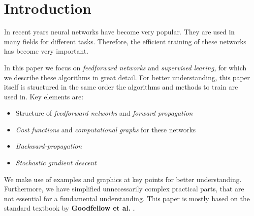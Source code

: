 \section{Introduction}
\label{sec:introduction}

In recent years neural networks have become very popular.
They are used in many fields for different tasks.
Therefore, the efficient training of these networks has become very important.

In this paper we focus on \emph{feedforward networks} and \emph{supervised learing}, for which we describe these algorithms in great detail.
For better understanding, this paper itself is structured in the same order the algorithms and methods to train are used in.
Key elements are:
\begin{itemize}
    \item Structure of \emph{feedforward networks} and \emph{forward propagation}
    \item \emph{Cost functions} and \emph{computational graphs} for these networks
    \item \emph{Backward-propagation}
    \item \emph{Stochastic gradient descent}
\end{itemize}
We make use of examples and graphics at key points for better understanding.
Furthermore, we have simplified unnecessarily complex practical parts, that are not essential for a fundamental understanding.
This paper is mostly based on the standard textbook by \textbf{Goodfellow et al.} \cite{Goodfellow-et-al-2016}.